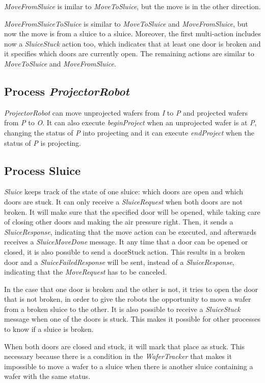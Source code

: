  \emph{MoveFromSluice} is imilar to \emph{MoveToSluice}, but the move is in the other direction.


 \emph{MoveFromSluiceToSluice} is similar to \emph{MoveToSluice} and \emph{MoveFromSluice}, but now the move is from a
 sluice to a sluice. Moreover, the first multi-action includes now a
 \emph{SluiceStuck} action too, which indicates that at least one door is broken and
 it specifies which doors are currently open. The remaining actions are
 similar to \emph{MoveToSluice} and \emph{MoveFromSluice}.

 
\subsection{Process \emph{ProjectorRobot}}


 \emph{ProjectorRobot} can move unprojected wafers from \emph{I} to \emph{P} and projected wafers
 from \emph{P} to \emph{O}. It can also execute \emph{beginProject} when an unprojected wafer is
 at \emph{P}, changing the status of \emph{P} into projecting and it can execute \emph{endProject}
 when the status of \emph{P} is projecting.

\subsection{Process Sluice}


 \emph{Sluice} keeps track of the state of one sluice: which doors are open and
 which doors are stuck. It can only receive a \emph{SluiceRequest} when both doors
 are not broken. It will make sure that the specified door will be opened,
 while taking care of closing other doors and making the air pressure right.
 Then, it sends a \emph{SluiceResponse}, indicating that the move action can be
 executed, and afterwards receives a \emph{SluiceMoveDone} message. It any time that
 a door can be opened or closed, it is also possible to send a doorStuck
 action. This results in a broken door and a \emph{SluiceFailedResponse} will be
 sent, instead of a \emph{SluiceResponse}, indicating that the \emph{MoveRequest} has to
 be canceled.
 
 In the case that one door is broken and the other is not, it tries to open
 the door that is not broken, in order to give the robots the opportunity
 to move a wafer from a broken sluice to the other.
 It is also possible to receive a \emph{SluiceStuck} message when one of the doors
 is stuck. This makes it possible for other processes to know if a sluice is
 broken.
 
 When both doors are closed and stuck, it will mark that place as stuck. This
 necessary because there is a condition in the \emph{WaferTracker} that makes it
 impossible to move a wafer to a sluice when there is another sluice
 containing a wafer with the same status.

\cbend